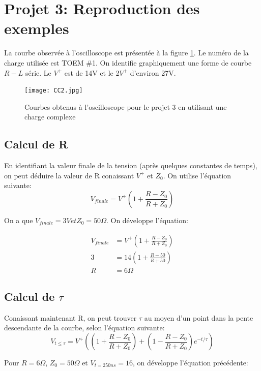 \newpage
\section{Projet 3: Reproduction des exemples}
La courbe observée à l'oscilloscope est présentée à la figure \ref{CC2}. Le numéro de la charge utilisée est TOEM \#1. On identifie graphiquement une forme de courbe $R-L$ série.  Le $V^{+}$  est de 14V et le 2$V^{+}$ d'environ 27V.

\begin{figure}[htb]
\begin{center}
\texttt{[image: CC2.jpg]}
\caption{Courbes obtenus à l'oscilloscope pour le projet 3 en utilisant une charge complexe}
\label{CC2}
\end{center}
\end{figure}

\subsection*{Calcul de R}
En identifiant la valeur finale de la tension (après quelques constantes de temps), on peut déduire la valeur de R conaissant $V^{+}$  et $Z_0$. On utilise l'équation suivante:
\begin{equation}
V_{finale} = V^{+} \left( 1 + \frac{R - Z_0}{R + Z_0}\right)
\end{equation}

On a que $V_{finale} = 3V et Z_0 = 50 \Omega$. On développe l'équation:

\begin{align*}
V_{finale} &= V^{+} \left( 1 + \frac{R - Z_0}{R + Z_0}\right)\\
3 &= 14 \left( 1 + \frac{R - 50}{R + 50}\right)\\
R &= 6 \Omega
\end{align*}

\subsection*{Calcul de $\tau$}

Conaissant maintenant R, on peut trouver $\tau$ au moyen d'un point dans la pente descendante de la courbe, selon l'équation suivante:
\begin{equation}
V_{t\leq \tau} = V^{+} \left( \left(1 + \frac{R - Z_0}{R + Z_0}\right) + \left(1 -\frac{R - Z_0}{R + Z_0}\right) e^{-t/\tau} \right)
\end{equation}

Pour $R=6 \Omega$, $Z_0 = 50 \Omega$ et $V_{t= 250ns} = 16$, on développe l'équation précédente:

